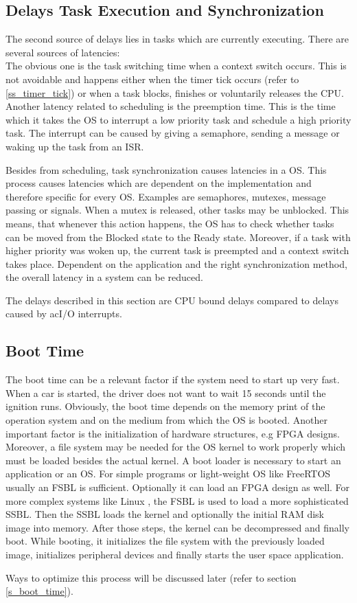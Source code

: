 \subsection{Delays Task Execution and Synchronization}
The second source of delays lies in tasks which are currently executing. 
There are several sources of latencies:
\\The obvious one is the task switching time when a context switch occurs.
This is not avoidable and happens either when the timer tick occurs (refer to \ref{ss_timer_tick}) or when a task blocks, finishes or voluntarily releases the \ac{CPU}.
Another latency related to scheduling is the preemption time.
This is the time which it takes the \ac{OS} to interrupt a low priority task and schedule a high priority task.
The interrupt can be caused by giving a semaphore, sending a message or waking up the task from an \ac{ISR}.
\par
Besides from scheduling, task synchronization causes latencies in a \ac{OS}.
This process causes latencies which are dependent on the implementation and therefore specific for every \ac{OS}.
Examples are semaphores, mutexes, message passing or signals. 
When a mutex is released, other tasks may be unblocked.
This means, that whenever this action happens, the \ac{OS} has to check whether tasks can be moved from the Blocked state to the Ready state.
Moreover, if a task with higher priority was woken up, the current task is preempted and a context switch takes place.
Dependent on the application and the right synchronization method, the overall latency in a system can be reduced.
\par
The delays described in this section are \ac{CPU} bound delays compared to delays caused by ac{I/O} interrupts.
 
\subsection{Boot Time}\label{ss_boot_time}
The boot time can be a relevant factor if the system need to start up very fast.
When a car is started, the driver does not want to wait 15 seconds until the ignition runs.
Obviously, the boot time depends on the memory print of the operation system and on the medium from which the \ac{OS} is booted.
Another important factor is the initialization of hardware structures, e.g \ac{FPGA} designs.
Moreover, a file system may be needed for the \ac{OS} kernel to work properly which must be loaded besides the actual kernel. 
A boot loader is necessary to start an application or an \ac{OS}.
For simple programs or light-weight \ac{OS} like FreeRTOS usually an \ac{FSBL} is sufficient.
Optionally it can load an \ac{FPGA} design as well.
For more complex systems like Linux \cite{jones:itlbp}, the \ac{FSBL} is used to load a more sophisticated \ac{SSBL}.
Then the \ac{SSBL} loads the kernel and optionally the initial RAM disk image into memory.
After those steps, the kernel can be decompressed and finally boot.
While booting, it initializes the file system with the previously loaded image, initializes peripheral devices and finally starts the user space application. 
\par
Ways to optimize this process will be discussed later (refer to section \ref{s_boot_time}).


